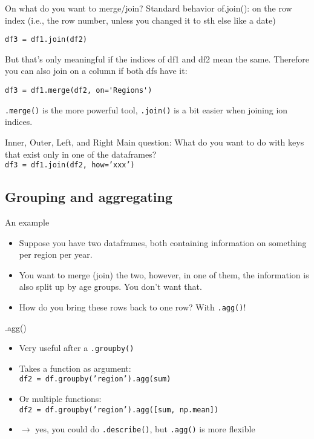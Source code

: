 \begin{frame}[fragile]{On what do you want to merge/join?}
Standard behavior of.join(): on the row index  (i.e., the row number, unless
you changed it to sth else like a date)
\begin{lstlisting}
df3 = df1.join(df2)
\end{lstlisting}
\pause
But that’s only meaningful if the indices of df1 and df2 mean the same. Therefore you can also join on a column if both dfs have it:
\begin{lstlisting}
df3 = df1.merge(df2, on='Regions')
\end{lstlisting}
\pause
\texttt{.merge()} is the more powerful tool, \texttt{.join()} is a bit easier when joining ion indices.
\end{frame}

\begin{frame}[fragile]{Inner, Outer, Left, and Right}
Main question: What do you want to do with keys that exist only in one of the  dataframes? \\
\pause
\vfill
\texttt{df3 = df1.join(df2, how='xxx')}\\
\vfill

\end{frame}



\subsection{Grouping and aggregating}


\begin{frame}{An example}
\begin{itemize}
	\item Suppose you have two dataframes, both containing information on something  per region per year.
	\item You want to merge (join) the two, however, in one of them, the information is also split up by age groups. You don't want that.
	\item How do you bring these rows back to one row? With \texttt{.agg()}!
\end{itemize}

\end{frame}


\begin{frame}{.agg()}
\begin{itemize}[<+->]
	\item Very useful after a \texttt{.groupby()}
	\item Takes a function as argument: \\	\texttt{df2 = df.groupby('region').agg(sum)}
	\item Or multiple functions: \\ \texttt{df2 = df.groupby('region').agg([sum, np.mean])}
	\item $\rightarrow$ yes, you could do \texttt{.describe()}, but \texttt{.agg()} is more flexible	
\end{itemize}
\end{frame}


